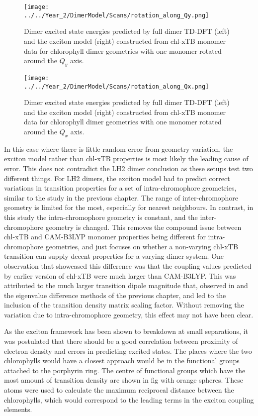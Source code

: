 \begin{figure}
    \centering
    \texttt{[image: ../../Year\_2/DimerModel/Scans/rotation\_along\_Qy.png]}
    \label{fig:chl_xtb_rot_Qy}
    \caption{Dimer excited state energies predicted by full dimer TD-DFT (left)
    and the exciton model (right) constructed from chl-xTB monomer data for chlorophyll 
    dimer geometries with one monomer rotated around the $Q_y$ axis.}
\end{figure}

\begin{figure}
    \centering
    \texttt{[image: ../../Year\_2/DimerModel/Scans/rotation\_along\_Qx.png]}
    \label{fig:chl_xtb_rot_Qx}
    \caption{Dimer excited state energies predicted by full dimer TD-DFT (left)
    and the exciton model (right) constructed from chl-xTB monomer data for chlorophyll 
    dimer geometries with one monomer rotated around the $Q_x$ axis.}
\end{figure}

In this case where there is little random error from geometry variation, the exciton
model rather than chl-xTB properties is most likely the leading cause of error. 
This does not contradict the LH2 dimer conclusion as these setups test two different
things. For LH2 dimers, the exciton model had to predict correct variations in transition
properties for a set of intra-chromophore geometries, similar to the study in the 
previous chapter. The range of inter-chromophore geometry is limited for the most,
especially for nearest neighbours. In contrast, in this study the intra-chromophore 
geometry is constant, and the inter-chromophore geometry is changed. This removes
the compound issue between chl-xTB and CAM-B3LYP monomer properties being different
for intra-chromophore geometries, and just focuses on whether a non-varying chl-xTB
transition can supply decent properties for a varying dimer system. One observation
that showcased this difference was that the coupling values predicted by earlier
version of chl-xTB were much larger than CAM-B3LYP. This was attributed to the much
larger transition dipole magnitude that, observed in \dscf and the eigenvalue difference 
methods of the previous chapter, and led to the inclusion of the transition density
matrix scaling factor. Without removing the variation due to intra-chromophore geometry, 
this effect may not have been clear.

As the exciton framework has been shown to breakdown at small separations, it was
postulated that there should be a good correlation between proximity of electron
density and errors in predicting excited states. The places where the two chlorophylls
would have a closest approach would be in the functional groups attached to the 
porphyrin ring. The centre of functional groups which have the most amount of transition
density are shown in fig with orange spheres. These atoms were used to calculate
the maximum reciprocal distance between the chlorophylls, which would correspond
to the leading terms in the exciton coupling elements.

